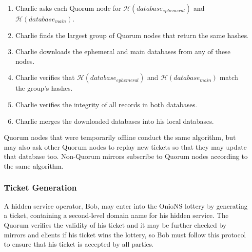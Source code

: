 \documentclass[USenglish,oneside,twocolumn]{article}
\begin{document}
\begin{enumerate}
	\item Charlie asks each Quorum node for $ \mathcal{H}(\mathit{database}_{ephemeral}) $ and $ \mathcal{H}(\mathit{database}_{main}) $.
	\item Charlie finds the largest group of Quorum nodes that return the same hashes.
	\item Charlie downloads the ephemeral and main databases from any of these nodes.
	\item Charlie verifies that $ \mathcal{H}(\mathit{database}_{ephemeral}) $ and $ \mathcal{H}(\mathit{database}_{main}) $ match the group's hashes.
	\item Charlie verifies the integrity of all records in both databases.
	\item Charlie merges the downloaded databases into his local databases.
\end{enumerate}

Quorum nodes that were temporarily offline conduct the same algorithm, but may also ask other Quorum nodes to replay new tickets so that they may update that database too. Non-Quorum mirrors subscribe to Quorum nodes according to the same algorithm.


\subsubsection{Ticket Generation} %
\label{sec:ticketGeneration}

A hidden service operator, Bob, may enter into the OnioNS lottery by generating a ticket, containing a second-level domain name for his hidden service. The Quorum verifies the validity of his ticket and it may be further checked by mirrors and clients if his ticket wins the lottery, so Bob must follow this protocol to ensure that his ticket is accepted by all parties.
\end{document}
